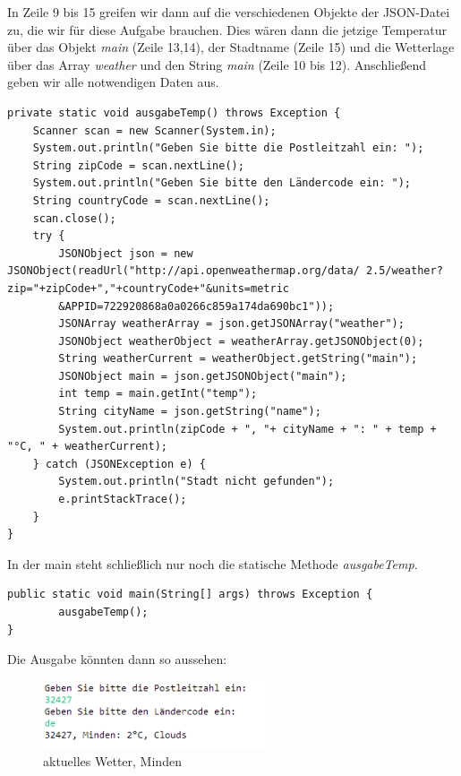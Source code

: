 In Zeile 9 bis 15 greifen wir dann auf die verschiedenen Objekte der JSON-Datei zu, die wir für diese Aufgabe brauchen. Dies wären dann die jetzige Temperatur über das Objekt \textit{main} (Zeile 13,14), der Stadtname (Zeile 15) und die Wetterlage über das Array \textit{weather} und den String \textit{main} (Zeile 10 bis 12). Anschließend geben wir alle notwendigen Daten aus. \\

\begin{lstlisting}[caption={ausgabeTemp}]
private static void ausgabeTemp() throws Exception {
	Scanner scan = new Scanner(System.in);
	System.out.println("Geben Sie bitte die Postleitzahl ein: ");
	String zipCode = scan.nextLine();
	System.out.println("Geben Sie bitte den Ländercode ein: ");
	String countryCode = scan.nextLine();
	scan.close();
	try {
		JSONObject json = new JSONObject(readUrl("http://api.openweathermap.org/data/ 2.5/weather?zip="+zipCode+","+countryCode+"&units=metric
		&APPID=722920868a0a0266c859a174da690bc1"));
		JSONArray weatherArray = json.getJSONArray("weather");
		JSONObject weatherObject = weatherArray.getJSONObject(0);
		String weatherCurrent = weatherObject.getString("main");
		JSONObject main = json.getJSONObject("main");
		int temp = main.getInt("temp");
		String cityName = json.getString("name");
		System.out.println(zipCode + ", "+ cityName + ": " + temp + "°C, " + weatherCurrent);
	} catch (JSONException e) {
		System.out.println("Stadt nicht gefunden");
		e.printStackTrace();
	}
}
\end{lstlisting}

In der main steht schließlich nur noch die statische Methode \textit{ausgabeTemp}.

\begin{lstlisting}[caption={main}]
public static void main(String[] args) throws Exception {
		ausgabeTemp();
}
\end{lstlisting}

Die Ausgabe könnten dann so aussehen: 

\begin{figure}[htbp]
\begin{center}
\includegraphics[width=0.6\textwidth]{Bild2}
\caption{aktuelles Wetter, Minden}
\end{center}
\end{figure}


